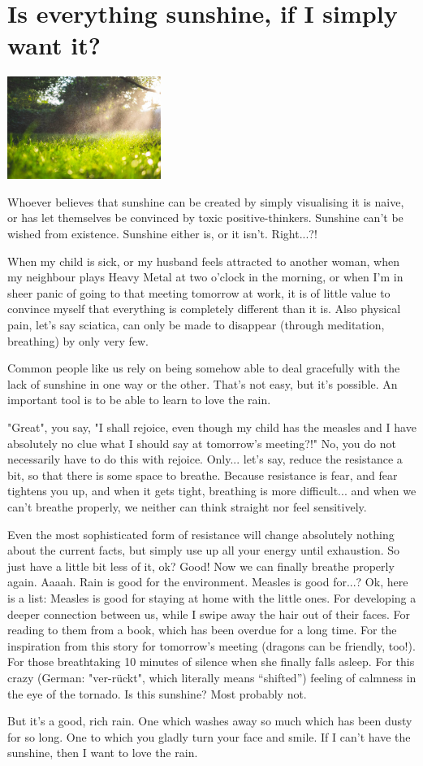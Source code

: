 \section{Is everything sunshine, if I simply want it?}

\begin{center}
\includegraphics[width=5cm]{images/20_sunshine.jpg}
\end{center}

Whoever believes that sunshine can be created by simply visualising it is naive, or has let themselves be convinced by toxic positive-thinkers. Sunshine can't be wished from existence. Sunshine either is, or it isn't. Right...?!

When my child is sick, or my husband feels attracted to another woman, when my neighbour plays Heavy Metal at two o'clock in the morning, or when I'm in sheer panic of going to that meeting tomorrow at work, it is of little value to convince myself that everything is completely different than it is. Also physical pain, let's say sciatica, can only be made to disappear (through meditation, breathing) by only very few.

Common people like us rely on being somehow able to deal gracefully with the lack of sunshine in one way or the other. That's not easy, but it's possible. An important tool is to be able to learn to love the rain.

"Great", you say, "I shall rejoice, even though my child has the measles and I have absolutely no clue what I should say at tomorrow's meeting?!" No, you do not necessarily have to do this with rejoice. Only... let's say, reduce the resistance a bit, so that there is some space to breathe. Because resistance is fear, and fear tightens you up, and when it gets tight, breathing is more difficult... and when we can't breathe properly, we neither can think straight nor feel sensitively.

Even the most sophisticated form of resistance will change absolutely nothing about the current facts, but simply use up all your energy until exhaustion. So just have a little bit less of it, ok? Good! Now we can finally breathe properly again. Aaaah. Rain is good for the environment. Measles is good for...? Ok, here is a list: Measles is good for staying at home with the little ones. For developing a deeper connection between us, while I swipe away the hair out of their faces. For reading to them from a book, which has been overdue for a long time. For the inspiration from this story for tomorrow's meeting (dragons can be friendly, too!). For those breathtaking 10 minutes of silence when she finally falls asleep. For this crazy (German: "ver-rückt", which literally means “shifted”) feeling of calmness in the eye of the tornado. Is this sunshine? Most probably not.

But it's a good, rich rain. One which washes away so much which has been dusty for so long. One to which you gladly turn your face and smile. If I can't have the sunshine, then I want to love the rain.
